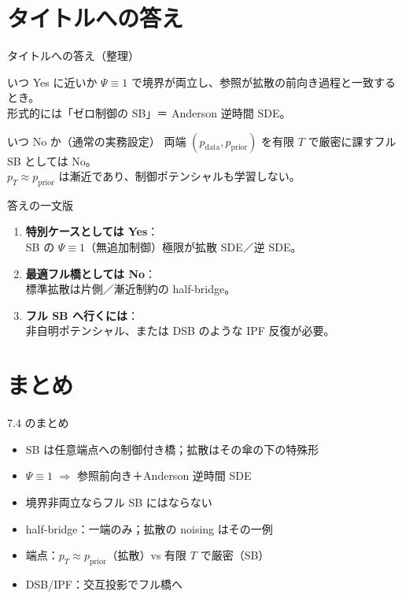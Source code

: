 \section{タイトルへの答え}
\asmain
\begin{frame}{タイトルへの答え（整理）}
    \begin{block}{いつ Yes に近いか}
        $\Psi\equiv 1$ で境界が両立し、参照が拡散の前向き過程と一致するとき。\\
        形式的には「ゼロ制御の SB」＝ Anderson 逆時間 SDE。
    \end{block}
    \begin{alertblock}{いつ No か（通常の実務設定）}
        両端 $(p_{\mathrm{data}},p_{\mathrm{prior}})$ を有限 $T$ で厳密に課すフル SB としては No。\\
        $p_T\approx p_{\mathrm{prior}}$ は漸近であり、制御ポテンシャルも学習しない。
    \end{alertblock}
\end{frame}
\asmain
\begin{frame}{答えの一文版}
    \begin{enumerate}
        \item \textbf{特別ケースとしては Yes}：\\
        SB の $\Psi\equiv 1$（無追加制御）極限が拡散 SDE／逆 SDE。
        \item \textbf{最適フル橋としては No}：\\
        標準拡散は片側／漸近制約の half-bridge。
        \item \textbf{フル SB へ行くには}：\\
        非自明ポテンシャル、または DSB のような IPF 反復が必要。
    \end{enumerate}
\end{frame}
\section{まとめ}
\asmain
\begin{frame}{7.4 のまとめ}
    \begin{itemize}
        \item SB は任意端点への制御付き橋；拡散はその傘の下の特殊形
        \item $\Psi\equiv 1$ $\Rightarrow$ 参照前向き＋Anderson 逆時間 SDE
        \item 境界非両立ならフル SB にはならない
        \item half-bridge：一端のみ；拡散の noising はその一例
        \item 端点：$p_T\approx p_{\mathrm{prior}}$（拡散）vs 有限 $T$ で厳密（SB）
        \item DSB/IPF：交互投影でフル橋へ
    \end{itemize}
\end{frame}